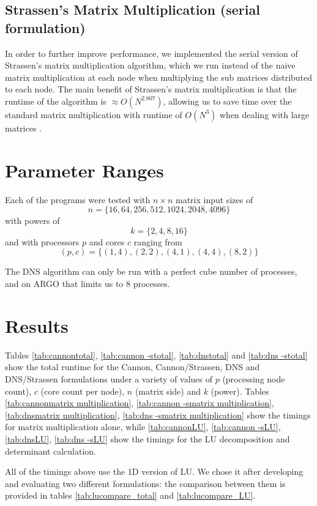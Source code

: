 \documentclass{article}
\begin{document}
\subsection{Strassen's Matrix Multiplication (serial formulation)}

In order to further improve performance, we implemented the serial version of
Strassen's matrix multiplication algorithm, which we run instead of the naive
matrix multiplication at each node when multiplying the sub matrices distributed
to each node.  The main benefit of Strassen's matrix multiplication is that the
runtime of the algorithm is $\approx O(N^{2.807})$, allowing us to save time
over the standard matrix multiplication with runtime of $O(N^3)$ when dealing
with large matrices .

\section{Parameter Ranges}

Each of the programs were tested with $n \times n$ matrix input sizes of $$n =
\{ 16, 64, 256, 512, 1024, 2048, 4096 \}$$ with powers of $$k=\{ 2, 4, 8,
16 \}$$ and with processors $p$ and cores $c$ ranging from $$(p,c) = \{ (1,4),
(2,2), (4,1), (4,4), (8,2) \}$$

The DNS algorithm can only be run with a perfect cube number of processes, and
on ARGO that limits us to 8 processes.

\section{Results}

Tables \ref{tab:cannontotal}, \ref{tab:cannon -stotal}, \ref{tab:dnstotal} and \ref{tab:dns -stotal} show the total runtime for the Cannon, Cannon/Strassen, DNS and DNS/Strassen formulations under a variety of values of $p$ (processing node count), $c$ (core count per node), $n$ (matrix side) and $k$ (power). Tables \ref{tab:cannonmatrix multiplication}, \ref{tab:cannon -smatrix multiplication}, \ref{tab:dnsmatrix multiplication}, \ref{tab:dns -smatrix multiplication} show the timings for matrix multiplication alone, while \ref{tab:cannonLU}, \ref{tab:cannon -sLU}, \ref{tab:dnsLU}, \ref{tab:dns -sLU} show the timings for the LU decomposition and determinant calculation.

All of the timings above use the 1D version of LU. We chose it after developing and evaluating two different formulations: the comparison between them is provided in tables \ref{tab:lucompare_total} and \ref{tab:lucompare_LU}.
\end{document}
